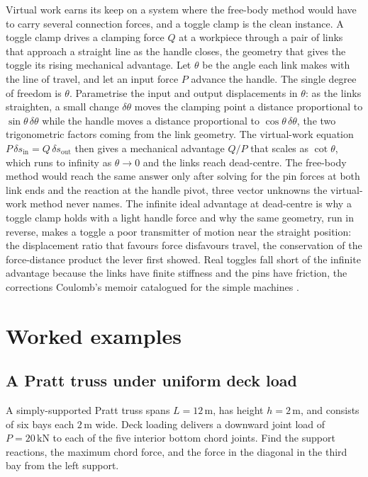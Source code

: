 \begin{mastery}
Virtual work earns its keep on a system where the free-body method would
have to carry several connection forces, and a toggle clamp is the clean
instance. A toggle clamp drives a clamping force $Q$ at a workpiece
through a pair of links that approach a straight line as the handle
closes, the geometry that gives the toggle its rising mechanical
advantage. Let $\theta$ be the angle each link makes with the line of
travel, and let an input force $P$ advance the handle. The single degree
of freedom is $\theta$. Parametrise the input and output displacements in
$\theta$: as the links straighten, a small change $\delta\theta$ moves the
clamping point a distance proportional to $\sin\theta\,\delta\theta$ while
the handle moves a distance proportional to $\cos\theta\,\delta\theta$,
the two trigonometric factors coming from the link geometry. The
virtual-work equation $P\,\delta s_{\text{in}} = Q\,\delta s_{\text{out}}$
then gives a mechanical advantage $Q/P$ that scales as $\cot\theta$, which
runs to infinity as $\theta\to 0$ and the links reach dead-centre. The
free-body method would reach the same answer only after solving for the
pin forces at both link ends and the reaction at the handle pivot, three
vector unknowns the virtual-work method never names. The infinite
ideal advantage at dead-centre is why a toggle clamp holds with a light
handle force and why the same geometry, run in reverse, makes a toggle a
poor transmitter of motion near the straight position: the displacement
ratio that favours force disfavours travel, the conservation of the
force-distance product the lever first showed. Real toggles fall short of
the infinite advantage because the links have finite stiffness and the
pins have friction, the corrections Coulomb's memoir catalogued for the
simple machines \cite{hist:coulomb1781}.
\end{mastery}

\section{Worked examples}

\subsection{A Pratt truss under uniform deck load}

A simply-supported Pratt truss spans $L = 12\,\si{\meter}$, has
height $h = 2\,\si{\meter}$, and consists of six bays each
$2\,\si{\meter}$ wide. Deck loading delivers a downward joint
load of $P = 20\,\text{kN}$ to each of the five interior bottom
chord joints. Find the support reactions, the maximum chord force,
and the force in the diagonal in the third bay from the left
support.

